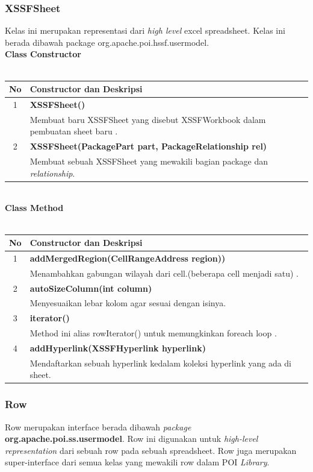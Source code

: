 \subsubsection{XSSFSheet}
Kelas ini merupakan representasi dari \textit{high level} excel spreadsheet. Kelas ini berada dibawah package org.apache.poi.hssf.usermodel.\cite{tutpoint}
\\
\noindent \textbf{Class Constructor}\\ \\
	\begin{tabular}{|c|p{12cm}|}
		\hline
		\textbf{No} & \textbf{Constructor dan Deskripsi} \\ \hline \hline
		1 & \textbf{XSSFSheet()}\\
			&	Membuat baru XSSFSheet yang disebut XSSFWorkbook dalam pembuatan sheet baru .\\ \hline 
		2 & \textbf{XSSFSheet(PackagePart part, PackageRelationship rel)}\\
			&	Membuat sebuah XSSFSheet yang mewakili bagian package dan \textit{relationship}.\\ \hline
	\end{tabular}
\\
\noindent \textbf{Class Method}\\ \\
	\begin{tabular}{|c|p{12cm}|}
		\hline
		\textbf{No} & \textbf{Constructor dan Deskripsi} \\ \hline \hline
		1 & \textbf{addMergedRegion(CellRangeAddress region))}\\
			&	Menambahkan gabungan wilayah dari cell.(beberapa cell menjadi satu)   .\\ \hline 
		2 & \textbf{autoSizeColumn(int column)}\\
			& Menyesuaikan lebar kolom agar sesuai dengan isinya.\\ \hline
		3 & \textbf{iterator()}\\
			&	Method ini alias rowIterator() untuk memungkinkan foreach loop .\\ \hline
		4 & \textbf{addHyperlink(XSSFHyperlink hyperlink)}\\
			&	Mendaftarkan sebuah hyperlink kedalam koleksi hyperlink yang ada di sheet.\\ \hline	
	\end{tabular}

\subsubsection{Row}
Row merupakan interface berada dibawah \textit{package} \textbf{org.apache.poi.ss.usermodel}. Row ini digunakan untuk \textit{high-level representation} dari sebuah row pada sebuah spreadsheet. Row juga merupakan super-interface dari semua kelas yang mewakili row dalam POI \textit{Library}.\cite{tutpoint}

